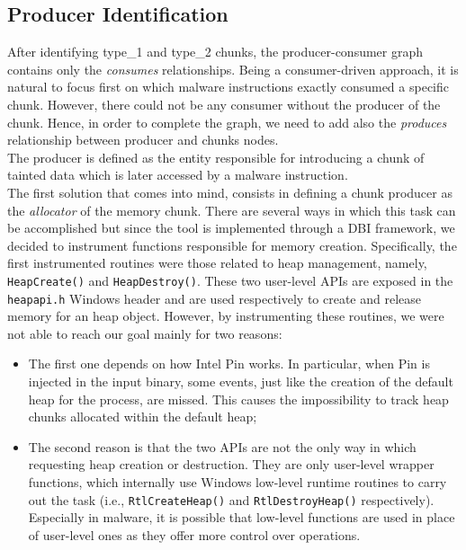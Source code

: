 \documentclass[LaM,binding=0.6cm]{sapthesis}
\begin{document}
\subsection{Producer Identification}
\label{subsec:produceridentification}
After identifying type\_1 and type\_2 chunks, the producer-consumer graph contains only the \textit{consumes} relationships. Being a consumer-driven approach, it is natural to focus first on which malware instructions exactly consumed a specific chunk. However, there could not be any consumer without the producer of the chunk. Hence, in order to complete the graph, we need to add also the \textit{produces} relationship between producer and chunks nodes.\\

The producer is defined as the entity responsible for introducing a chunk of tainted data which is later accessed by a malware instruction.\\
The first solution that comes into mind, consists in defining a chunk producer as the \textit{allocator} of the memory chunk. There are several ways in which this task can be accomplished but since the tool is implemented through a DBI framework, we decided to instrument functions responsible for memory creation. Specifically, the first instrumented routines were those related to heap management, namely, \texttt{HeapCreate()} and \texttt{HeapDestroy()}. These two user-level APIs are exposed in the \texttt{heapapi.h} Windows header\cite{heapapih77:online} and are used respectively to create and release memory for an heap object. However, by instrumenting these routines, we were not able to reach our goal mainly for two reasons:
\begin{itemize}
\item The first one depends on how Intel Pin works. In particular, when Pin is injected in the input binary, some events, just like the creation of the default heap for the process, are missed. This causes the impossibility to track heap chunks allocated within the default heap;
\item The second reason is that the two APIs are not the only way in which requesting heap creation or destruction. They are only user-level wrapper functions, which internally use Windows low-level runtime routines to carry out the task (i.e., \texttt{RtlCreateHeap()} and \texttt{RtlDestroyHeap()} respectively). Especially in malware, it is possible that low-level functions are used in place of user-level ones as they offer more control over operations.
\end{itemize} 
\end{document}
